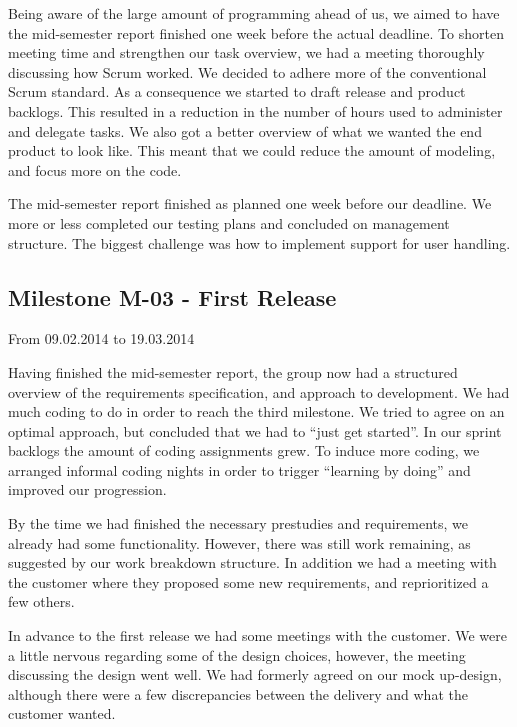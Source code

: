 Being aware of the large amount of programming ahead of us, we aimed to
have the mid-semester report finished one week before the actual
deadline. To shorten meeting time and strengthen our task overview, we had a
meeting thoroughly discussing how Scrum worked. We decided to adhere
more of the conventional Scrum standard. As a consequence we started to
draft release and product backlogs. This resulted in a reduction in the number
of hours used to administer and delegate tasks. We also got a
better overview of what we wanted the end product to look like. This meant that we could
reduce the amount of modeling, and focus more on the code. 


The mid-semester report finished as planned one week before our
deadline. We more or less completed our testing plans and concluded on
management structure. The biggest challenge was how to implement
support for user handling. 




\subsection{Milestone M-03 - First Release}
\label{sec:M03}
From 09.02.2014 to 19.03.2014

Having finished the mid-semester report, the group now had a structured
overview of the requirements specification, and approach
to development. We had much coding to do in order to reach the third
milestone. We tried to agree on an optimal approach, but concluded that
we had to ``just get started''. In
our sprint backlogs the amount of coding assignments grew. To induce
more coding, we arranged informal coding nights in order to trigger
``learning by doing'' and improved
our progression.




By the time we had finished the necessary prestudies and requirements,
we already had some functionality. However, there was still work
remaining, as suggested by our work breakdown structure. In addition we
had a meeting with the customer where they proposed some new
requirements, and reprioritized a few others. 




In advance to the first release we had some meetings with the customer.
We were a little nervous regarding some of the design choices, however, the
meeting discussing the design went well. We had formerly agreed on our
mock up-design, although there were a few discrepancies between the
delivery and what the customer wanted. \ 




